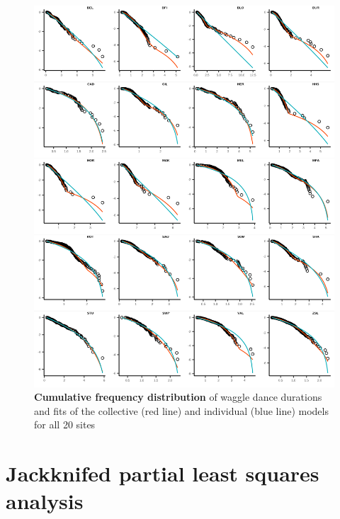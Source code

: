 \documentclass[12pt,letter]{amsart}
\begin{document}
\begin{figure}[h]
	\centering
	\includegraphics{../results/figures/SI_figures/allsites_plot.png}
	\caption{\textbf{Cumulative frequency distribution} of waggle dance durations and fits of the collective (red line) and individual (blue line) models for all 20 sites}
\end{figure}

\newpage

\section*{Jackknifed partial least squares analysis}
\end{document}
